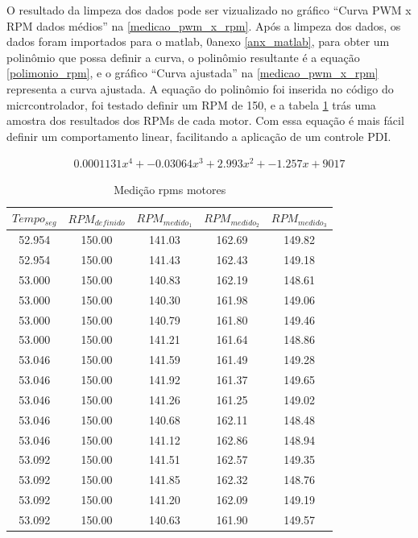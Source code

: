 O resultado da limpeza dos dados pode ser vizualizado no gráfico ``Curva PWM x RPM dados médios'' na \autoref{medicao_pwm_x_rpm}.
Após a limpeza dos dados, os dados foram importados para o matlab, 0anexo \ref{anx_matlab},
para obter um polinômio que possa definir a curva, o polinômio resultante é a equação \eqref{polimonio_rpm},
e o gráfico ``Curva ajustada'' na \autoref{medicao_pwm_x_rpm} representa a curva ajustada.
A equação do polinômio foi inserida no código do micrcontrolador, foi testado definir um RPM de 150,
e a tabela \ref{medicao_motores} trás uma amostra dos resultados dos RPMs de cada motor.
Com essa equação é mais fácil definir um comportamento linear, facilitando a aplicação de um controle PDI.

\begin{equation}
    \begin{split}
        0.0001131x^{4} + -0.03064x^{3} + 2.993x^{2} + -1.257x + 9017
    \end{split}
    \label{polimonio_rpm}
\end{equation}

\begin{table}[ht]
    \centering
	\caption{Medição rpms motores}
	 \begin{tabular}{|c|c|c|c|c|}
		\hline
		\textbf{$Tempo_{seg}$} & \textbf{$RPM_{definido}$} & \textbf{$RPM_{medido_{1}}$} & \textbf{$RPM_{medido_{2}}$} & \textbf{$RPM_{medido_{3}}$} \\ \hline
		52.954 & 150.00  & 141.03 & 162.69 & 149.82 \\ \hline
		52.954 & 150.00  & 141.43 & 162.43 & 149.18 \\ \hline
		53.000 & 150.00  & 140.83 & 162.19 & 148.61 \\ \hline
		53.000 & 150.00  & 140.30 & 161.98 & 149.06 \\ \hline
		53.000 & 150.00  & 140.79 & 161.80 & 149.46 \\ \hline
		53.000 & 150.00  & 141.21 & 161.64 & 148.86 \\ \hline
		53.046 & 150.00  & 141.59 & 161.49 & 149.28 \\ \hline
		53.046 & 150.00  & 141.92 & 161.37 & 149.65 \\ \hline
		53.046 & 150.00  & 141.26 & 161.25 & 149.02 \\ \hline
		53.046 & 150.00  & 140.68 & 162.11 & 148.48 \\ \hline
		53.046 & 150.00  & 141.12 & 162.86 & 148.94 \\ \hline
		53.092 & 150.00  & 141.51 & 162.57 & 149.35 \\ \hline
		53.092 & 150.00  & 141.85 & 162.32 & 148.76 \\ \hline
		53.092 & 150.00  & 141.20 & 162.09 & 149.19 \\ \hline
		53.092 & 150.00  & 140.63 & 161.90 & 149.57 \\ \hline
	\end{tabular}
	\label{medicao_motores}
\end{table}



